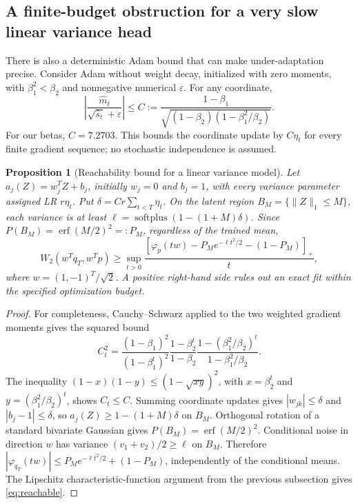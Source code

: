 \documentclass[11pt,a4paper]{article}
\newtheorem{proposition}{Proposition}[section]
\begin{document}
\subsection{A finite-budget obstruction for a very slow linear variance head}
There is also a deterministic Adam bound that can make under-adaptation precise.
Consider Adam without weight decay, initialized with zero moments, with
$\beta_1^2<\beta_2$ and nonnegative numerical $\varepsilon$. For any coordinate,
\begin{equation}
 \left|\frac{\widehat m_t}{\sqrt{\widehat s_t}+\varepsilon}\right|
 \le C:=\frac{1-\beta_1}{\sqrt{(1-\beta_2)(1-\beta_1^2/\beta_2)}}.
 \label{eq:adam-bound}
\end{equation}
For our betas, $C=7.2703$. This bounds the coordinate update by $C\eta_t$
for every finite gradient sequence; no stochastic independence is assumed.

\begin{proposition}[Reachability bound for a linear variance model]
Let $a_j(Z)=w_j^TZ+b_j$, initially $w_j=0$ and $b_j=1$, with every variance
parameter assigned LR $r\eta_t$. Put $\delta=C r\sum_{t<T}\eta_t$.
On the latent region $B_M=\{\|Z\|_1\le M\}$, each variance is at least
$\ell=\operatorname{softplus}(1-(1+M)\delta)$. Since
$P(B_M)=\operatorname{erf}(M/2)^2=:P_M$, regardless of the trained mean,
\begin{equation}
 W_2(w^Tq_T,w^Tp)\ge
 \sup_{t>0}\frac{[\varphi_p(tw)-P_Me^{-\ell t^2/2}-(1-P_M)]_+}{t},
 \label{eq:reachable}
\end{equation}
where $w=(1,-1)^T/\sqrt2$. A positive right-hand side rules out an exact fit
within the specified optimization budget.
\end{proposition}
\begin{proof}
For completeness, Cauchy--Schwarz applied to the two weighted gradient moments
gives the squared bound
\[
 C_t^2=\frac{(1-\beta_1)^2}{(1-\beta_1^t)^2}
 \frac{1-\beta_2^t}{1-\beta_2}
 \frac{1-(\beta_1^2/\beta_2)^t}{1-\beta_1^2/\beta_2}.
\]
The inequality $(1-x)(1-y)\le(1-\sqrt{xy})^2$, with
$x=\beta_2^t$ and $y=(\beta_1^2/\beta_2)^t$, shows $C_t\le C$.
Summing coordinate updates gives $|w_{jk}|\le\delta$ and $|b_j-1|\le\delta$,
so $a_j(Z)\ge1-(1+M)\delta$ on $B_M$. Orthogonal rotation of a standard
bivariate Gaussian gives $P(B_M)=\operatorname{erf}(M/2)^2$.
Conditional noise in direction $w$ has variance $(v_1+v_2)/2\ge\ell$ on
$B_M$. Therefore
$|\varphi_{q_T}(tw)|\le P_Me^{-\ell t^2/2}+(1-P_M)$, independently of
the conditional means. The Lipschitz characteristic-function argument from
the previous subsection gives \eqref{eq:reachable}.
\end{proof}
\end{document}
